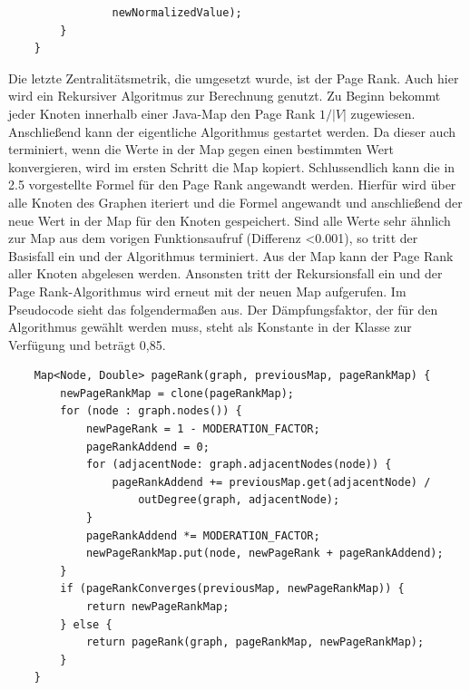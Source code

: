 \documentclass[a4paper,12pt,ngerman,chapterprefix=false,listof=totoc,bibliography=totoc]{scrreprt}
\begin{document}
{{{\begin{lstlisting}
				newNormalizedValue);
		}
	}
\end{lstlisting}
Die letzte Zentralitätsmetrik, die umgesetzt wurde, ist der Page Rank. Auch hier wird ein Rekursiver Algoritmus zur Berechnung genutzt. Zu Beginn bekommt jeder Knoten innerhalb einer Java-Map den Page Rank \(1/|V|\) zugewiesen. Anschließend kann der eigentliche Algorithmus gestartet werden. Da dieser auch terminiert, wenn die Werte in der Map gegen einen bestimmten Wert konvergieren, wird im ersten Schritt die Map kopiert. Schlussendlich kann die in 2.5 vorgestellte Formel für den Page Rank angewandt werden. Hierfür wird über alle Knoten des Graphen iteriert und die Formel angewandt und anschließend der neue Wert in der Map für den Knoten gespeichert. Sind alle Werte sehr ähnlich zur Map aus dem vorigen Funktionsaufruf (Differenz \textless 0.001), so tritt der Basisfall ein und der Algorithmus terminiert. Aus der Map kann der Page Rank aller Knoten abgelesen werden. Ansonsten tritt der Rekursionsfall ein und der Page Rank-Algorithmus wird erneut mit der neuen Map aufgerufen. Im Pseudocode sieht das folgendermaßen aus. Der Dämpfungsfaktor, der für den Algorithmus gewählt werden muss, steht als Konstante in der Klasse zur Verfügung und beträgt 0,85.
\begin{lstlisting}
	Map<Node, Double> pageRank(graph, previousMap, pageRankMap) {
		newPageRankMap = clone(pageRankMap);
		for (node : graph.nodes()) {
			newPageRank = 1 - MODERATION_FACTOR;
			pageRankAddend = 0;
			for (adjacentNode: graph.adjacentNodes(node)) {
				pageRankAddend += previousMap.get(adjacentNode) /
					outDegree(graph, adjacentNode);
			}
			pageRankAddend *= MODERATION_FACTOR;
			newPageRankMap.put(node, newPageRank + pageRankAddend);
		}
		if (pageRankConverges(previousMap, newPageRankMap)) {
			return newPageRankMap;
		} else {
			return pageRank(graph, pageRankMap, newPageRankMap);
		}
	}
\end{lstlisting}
}
}}
\end{document}
